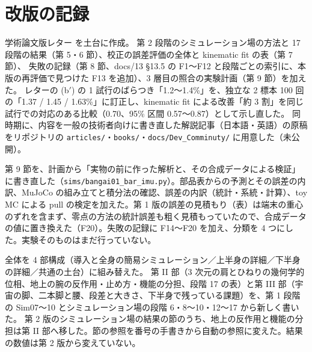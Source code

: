 \documentclass[paper=a4paper,fontsize=10pt,twocolumn,column_gap=2zw,line_length=24zw,number_of_lines=46,head_space=20mm]{jlreq}
\begin{document}
\section{改版の記録}
\small
\begin{description}\setlength{\itemsep}{0pt}
\item[第 1 版（2026-11-26）] 学術論文版レター \cite{letter2026} を土台に作成。
第 2 段階のシミュレーション場の方法と 17 段階の結果（第 5・6 節）、校正の誤差評価の全体と kinematic fit の表（第 7 節）、
失敗の記録（第 8 節、docs/13 §13.5 の F1〜F12 と段階ごとの索引に、本版の再評価で見つけた F13 を追加）、3 層目の照合の実験計画（第 9 節）を加えた。
レターの (b$'$) の 1 試行のばらつき「1.2〜1.4\%」を、独立な 2 標本 100 回の「1.37 / 1.45 / 1.63\%」に訂正し、kinematic fit による改善「約 3 割」を同じ試行での対応のある比較（0.70、95\% 区間 0.57〜0.87）として示し直した。
同時期に、内容を一般の技術者向けに書き直した解説記事（日本語・英語）の原稿をリポジトリの \texttt{articles/}・\texttt{books/}・\texttt{docs/Dev\_Comminuty/} に用意した（未公開）。
\item[第 2 版（2026-11-26）] 第 9 節を、計画から「実物の前に作った解析と、その合成データによる検証」に書き直した（\texttt{sims/bangai01\_bar\_imu.py}）。部品表からの予測とその誤差の内訳、MuJoCo の組み立てと積分法の確認、誤差の内訳（統計・系統・計算）、toy MC による pull の検定を加えた。第 1 版の誤差の見積もり（表）は端末の重心のずれを含まず、零点の方法の統計誤差も粗く見積もっていたので、合成データの値に置き換えた（F20）。失敗の記録に F14〜F20 を加え、分類を 4 つにした。実験そのものはまだ行っていない。
\item[第 3 版（2026-11-26）] 全体を 4 部構成（導入と全身の簡易シミュレーション／上半身の詳細／下半身の詳細／共通の土台）に組み替えた。
第 II 部（3 次元の肩とひねりの幾何学的位相、地上の腕の反作用・止め方・機能の分担、段階 17 の表）と第 III 部（宇宙の脚、二本脚と腰、段差と大きさ、下半身で残っている課題）を、第 1 段階の Sim07〜10 とシミュレーション場の段階 6・8〜10・12〜17 から新しく書いた。
第 2 版のシミュレーション場の結果の節のうち、地上の反作用と機能の分担は第 II 部へ移した。節の参照を番号の手書きから自動の参照に変えた。結果の数値は第 2 版から変えていない。
\end{description}
\end{document}
